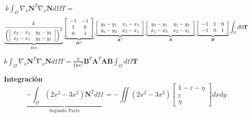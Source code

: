 \documentclass[12pt]{report}
\begin{document}
    \begin{center}
        $\displaystyle\ k \int_\Omega \nabla_x \bm N^T \nabla_x \bm N d\Omega T = $
        \[
        \displaystyle 
        \linebreak \underbrace{\frac{k}{\left( \left| \begin{array}{cc} x_2-x_1 & y_2-y_1 \\ x_3-x_1 & y_3 - y_1 \end{array}\right| \right)^2}}_{\text{Det}} 
        \underbrace{\left[ \begin{array}{cc} -1 & -1 \\ 1 & 0 \\ 0 & 1 \end{array} \right] }_{\bm B^T}  
        \underbrace{\left[ \begin{array}{cc} y_3-y_1 & x_1 - x_3\\ y_1 - y_2 & x_2 - x_1 \end{array} \right]}_{\bm A^T} 
        \underbrace{\left[ \begin{array}{cc} y_3-y_1 & y_1 - y_2 \\ x_1 - x_3 & x_2 - x_1\end{array}\right]}_{\bm A} 
        \underbrace{\left[ \begin{array}{ccc} -1 & 1 & 0 \\ -1 & 0 & 1 \end{array} \right]}_{\bm B} \int_\Omega d\Omega \bm T
        \]
    \end{center}

    \newpage
    \begin{center}
        $\displaystyle k \int_\Omega \nabla_x \bm N^T \nabla_x \bm N d\Omega T  = \frac{k}{\text{Det}^2}\bm B^T \bm A^T \bm{AB} \int_\Omega d\Omega \bm T$
    \end{center}

    \begin{center}
        \textbf{Integración}
        \[
        \displaystyle  
        \underbrace{-\int_\Omega \left( 2x^2 -3x^2 \right) \bm N^T d\Omega}_{\text{Segunda Parte}} 
        \ = - \iint \left( 2x^2 -3x^2 \right) \left[ \begin{array}{c} 1-\varepsilon - \eta \\ \varepsilon \\ \eta \end{array} \right] dx dy
        \]
    \end{center}
\end{document}

